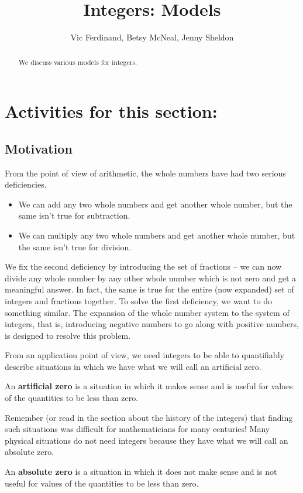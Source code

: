 \documentclass{ximera}
\title{Integers: Models}
\author{Vic Ferdinand, Betsy McNeal, Jenny Sheldon}
\begin{document}
\begin{abstract}
We discuss various models for integers.
\end{abstract}
\maketitle

\section{Activities for this section:}

\subsection{Motivation}

From the point of view of arithmetic, the whole numbers have had two serious deficiencies.
\begin{itemize}
	\item We can add any two whole numbers and get another whole number, but the same isn't true for subtraction.
	\item We can multiply any two whole numbers and get another whole number, but the same isn't true for division.
\end{itemize} 
We fix the second deficiency by introducing the set of fractions -- we can now divide any whole number by any other whole number which is not zero and get a meaningful answer.  In fact, the same is true for the entire (now expanded) set of integers and fractions together.  To solve the first deficiency, we want to do something similar.  The expansion of the whole number system to the system of integers, that is, introducing negative numbers to go along with positive numbers, is designed to resolve this problem.


From an application point of view, we need integers to be able to quantifiably describe situations in which we have what we will call an artificial zero.
\begin{definition}
An \textbf{artificial zero} is a situation in which it makes sense and is useful for values of the quantities to be less than zero.
\end{definition}
 Remember (or read in the section about the history of the integers) that finding such situations was difficult for mathematicians for many centuries!  Many physical situations do not need integers because they have what we will call an absolute zero.
 \begin{definition} An \textbf{absolute zero} is a situation in which it does not make sense and is not useful for values of the quantities to be less than zero.
 \end{definition}
 
\end{document}
